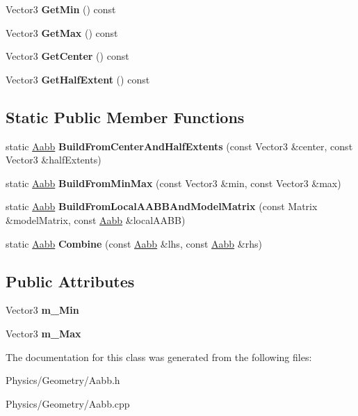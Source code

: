 \begin{DoxyCompactItemize}
\mbox{\label{classAabb_afe9a77744c815785d6b3c6fa4c3a8340}} 
Vector3 {\bfseries Get\+Min} () const
\item 
\mbox{\label{classAabb_ad221f8c84e946375de4c07bdef67e157}} 
Vector3 {\bfseries Get\+Max} () const
\item 
\mbox{\label{classAabb_a22fbf825e411bdcbf24c277f1f266d0c}} 
Vector3 {\bfseries Get\+Center} () const
\item 
\mbox{\label{classAabb_a06b1e4e71b018b2e5969f49b460f8ae0}} 
Vector3 {\bfseries Get\+Half\+Extent} () const
\end{DoxyCompactItemize}
\subsection*{Static Public Member Functions}
\begin{DoxyCompactItemize}
\item 
\mbox{\label{classAabb_a97ee8719ddae080c16c206f5724b5a9f}} 
static \hyperlink{classAabb}{Aabb} {\bfseries Build\+From\+Center\+And\+Half\+Extents} (const Vector3 \&center, const Vector3 \&half\+Extents)
\item 
\mbox{\label{classAabb_a3b8654c48a3713faebbe7490e261eb6e}} 
static \hyperlink{classAabb}{Aabb} {\bfseries Build\+From\+Min\+Max} (const Vector3 \&min, const Vector3 \&max)
\item 
\mbox{\label{classAabb_a32c65313d0c0b6f3918473340cd7c129}} 
static \hyperlink{classAabb}{Aabb} {\bfseries Build\+From\+Local\+A\+A\+B\+B\+And\+Model\+Matrix} (const Matrix \&model\+Matrix, const \hyperlink{classAabb}{Aabb} \&local\+A\+A\+BB)
\item 
\mbox{\label{classAabb_a7f6f3ebe0340505f04b8bf1fc81c7e5f}} 
static \hyperlink{classAabb}{Aabb} {\bfseries Combine} (const \hyperlink{classAabb}{Aabb} \&lhs, const \hyperlink{classAabb}{Aabb} \&rhs)
\end{DoxyCompactItemize}
\subsection*{Public Attributes}
\begin{DoxyCompactItemize}
\item 
\mbox{\label{classAabb_ad97407c0cde4852c9d5b490c1f602302}} 
Vector3 {\bfseries m\+\_\+\+Min}
\item 
\mbox{\label{classAabb_a57e862b50109cbaa0e5b731060963bf9}} 
Vector3 {\bfseries m\+\_\+\+Max}
\end{DoxyCompactItemize}


The documentation for this class was generated from the following files\+:\begin{DoxyCompactItemize}
\item 
Physics/\+Geometry/Aabb.\+h\item 
Physics/\+Geometry/Aabb.\+cpp\end{DoxyCompactItemize}
